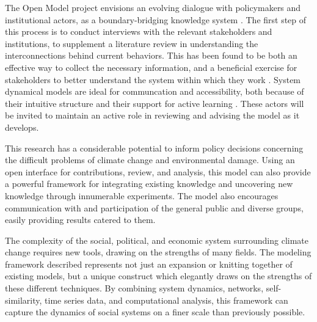 \documentclass[12pt, oneside]{amsart}
\begin{document}
The Open Model project envisions an evolving dialogue with policymakers and institutional actors, as a boundary-bridging knowledge system \citep{cash2003knowledge}.  The first step of this process is to conduct interviews with the relevant stakeholders and institutions, to supplement a literature review in understanding the interconnections behind current behaviors.  This has been found to be both an effective way to collect the necessary information, and a beneficial exercise for stakeholders to better understand the system within which they work \citep{rouwette2002group}.  System dynamical models are ideal for communcation and accessibility, both because of their intuitive structure and their support for active learning \citep{senge2006fifth}.  These actors will be invited to maintain an active role in reviewing and advising the model as it develops.

This research has a considerable potential to inform policy decisions concerning the difficult problems of climate change and environmental damage.  Using an open interface for contributions, review, and analysis, this model can also provide a powerful framework for integrating existing knowledge and uncovering new knowledge through innumerable experiments.  The model also encourages communication with and participation of the general public and diverse groups, easily providing results catered to them.

The complexity of the social, political, and economic system surrounding climate change requires new tools, drawing on the strengths of many fields.  The modeling framework described represents not just an expansion or knitting together of existing models, but a unique construct which elegantly draws on the strengths of these different techniques.  By combining system dynamics, networks, self-similarity, time series data, and computational analysis, this framework can capture the dynamics of social systems on a finer scale than previously possible.

\newpage
{}

\end{document}
